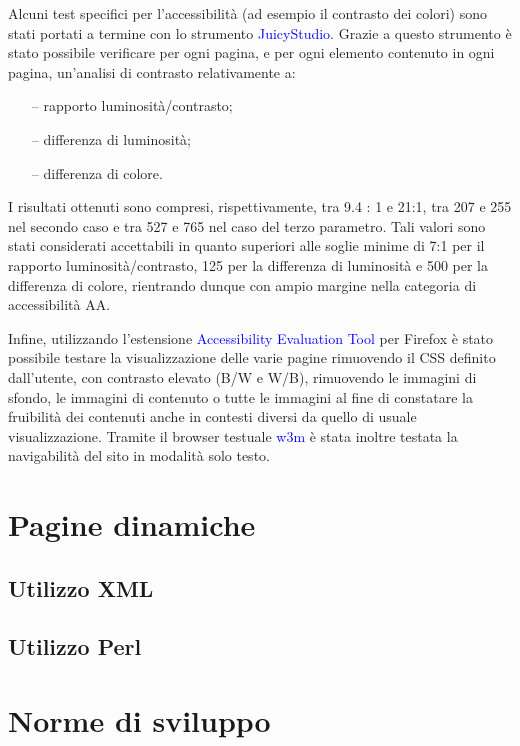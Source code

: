 \documentclass[10pt,a4paper,onecolumn]{article}
\newcommand{\progname}[1]{\textcolor{blue}{\textsf{#1}}}
\begin{document}
Alcuni test specifici per l'accessibilità (ad esempio il contrasto dei colori) sono stati portati a termine con lo strumento \progname{JuicyStudio}. Grazie a questo strumento è stato possibile verificare per ogni pagina, e per ogni elemento contenuto in ogni pagina, un'analisi di contrasto relativamente a:
\begin{itemize}[noitemsep,nolistsep]
  \item[--] rapporto luminosità/contrasto;
  \item[--] differenza di luminosità;
  \item[--] differenza di colore.
\end{itemize}

I risultati ottenuti sono compresi, rispettivamente, tra 9.4 : 1 e 21:1, tra 207 e 255 nel secondo caso e tra 527 e 765 nel caso del terzo parametro. Tali valori sono stati considerati accettabili in quanto superiori alle soglie minime di 7:1 per il rapporto luminosità/contrasto, 125 per la differenza di luminosità e 500 per la differenza di colore, rientrando dunque con ampio margine nella categoria di accessibilità AA\@.

Infine, utilizzando l'estensione \progname{Accessibility Evaluation Tool} per Firefox è stato possibile testare la visualizzazione delle varie pagine rimuovendo il CSS definito dall'utente, con contrasto elevato (B/W e W/B), rimuovendo le immagini di sfondo, le immagini di contenuto o tutte le immagini al fine di constatare la fruibilità dei contenuti anche in contesti diversi da quello di usuale visualizzazione. Tramite il browser testuale \progname{w3m} è stata inoltre testata la navigabilità del sito in modalità solo testo. 

\section{Pagine dinamiche}

\subsection{Utilizzo XML}

\subsection{Utilizzo Perl}

\clearpage

\section{Norme di sviluppo}
\end{document}
